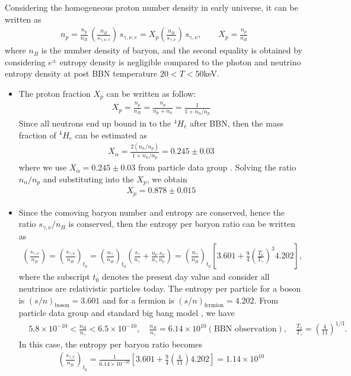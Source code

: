 \documentclass[Universe,article,submit,moreauthors,pdftex]{Definitions/mdpi}
\begin{document}
Considering the homogeneous proton number density in early universe, it can be written as
\begin{align}\label{density_proton}
n_p=\frac{n_p}{n_B}\,\left(\frac{n_B}{s_{\gamma,\nu,e}}\right)\,s_{\gamma,\nu,e}= X_p\left(\frac{n_B}{s_{\gamma,\nu}}\right)\,s_{\gamma,\nu},\qquad X_p=\frac{n_p}{n_B}
\end{align}
where $n_B$ is the number density of baryon, and the second equality is obtained by considering $e^\pm$ entropy density is negligible compared to the photon and neutrino entropy density at post BBN temperature $20<T<50$keV. 
\begin{itemize}

  \item The proton fraction $X_p$ can be written as follow:
  \begin{align}
  X_p=\frac{n_p}{n_B}=\frac{n_p}{n_p+n_n}=\frac{1}{1+n_n/n_p}
  \end{align}
Since all neutrons end up bound in to the $^4H_e$ after BBN, then the mass fraction of $^4H_e$ can be estimated as 
\begin{align}
X_\alpha=\frac{2(n_n/n_p)}{1+n_n/n_p}=0.245\pm0.03
\end{align} 
where we use $X_\alpha=0.245\pm0.03$ from particle data group \cite{ParticleDataGroup:2022pth}. Solving the ratio $n_n/n_p$ and substituting into the $X_p$, we obtain
\begin{align}
X_p=0.878\pm0.015
\end{align}

  \item Since the comoving baryon number and entropy are conserved, hence the ratio $s_{\gamma,\nu}/n_B$ is conserved, then the entropy per baryon ratio can be written as
\begin{align}
\left(\frac{s_{\gamma,\nu}}{n_B}\right)=\left(\frac{s_{\gamma,\nu}}{n_B}\right)_{\!\!t_0}\!\!=\left(\frac{n_\gamma}{n_B}\right)_{\!\!t_0}\left(\frac{s_\gamma}{n_\gamma}+\frac{n_\nu}{n_\gamma}\frac{s_\nu}{n_\nu}\right)=\left(\frac{n_\gamma}{n_B}\right)_{\!\!t_0}\left[3.601+\frac{9}{4}\left(\frac{T_\nu}{T_\gamma}\right)^{\!\!3}4.202\right],
\end{align}
where the subscript $t_0$ denotes the present day value and consider all neutrinos are relativistic particles today. The entropy per particle for a boson is $(s/n)_\mathrm{boson}=3.601$ and for a fermion is $(s/n)_\mathrm{fermion}=4.202$. From particle data group and standard big bang model \cite{ParticleDataGroup:2022pth,Kolb:1990vq}, we have
\begin{align}
&5.8\times10^{-10}<\frac{n_B}{n_\gamma}<6.5\times10^{-10},\quad\frac{n_B}{n_\gamma}=6.14\times10^{10}(\mathrm{BBN\,\,observation}),\quad\frac{T_\nu}{T_\gamma}=\left(\frac{4}{11}\right)^{1/3}.
\end{align}
In this case, the entropy per baryon ratio  becomes
\begin{align}
\left(\frac{s_{\gamma,\nu}}{n_B}\right)_{\!\!t_0}=\frac{1}{6.14\times10^{-10}}\left[3.601+\frac{9}{4}\left(\frac{4}{11}\right)4.202\right]=1.14\times10^{10}
\end{align}


\end{itemize}
\end{document}
